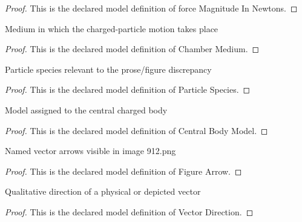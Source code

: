 \begin{proof}
  This is the declared model definition of force Magnitude In Newtons.
\end{proof}
\begin{definition}
  \label{def:physics:phyx-mini-0912:phyxminiproblems-problemphyxmini0912-chambermedium}
  Medium in which the charged-particle motion takes place
\end{definition}
\begin{proof}
  This is the declared model definition of Chamber Medium.
\end{proof}
\begin{definition}
  \label{def:physics:phyx-mini-0912:phyxminiproblems-problemphyxmini0912-particlespecies}
  Particle species relevant to the prose/figure discrepancy
\end{definition}
\begin{proof}
  This is the declared model definition of Particle Species.
\end{proof}
\begin{definition}
  \label{def:physics:phyx-mini-0912:phyxminiproblems-problemphyxmini0912-centralbodymodel}
  Model assigned to the central charged body
\end{definition}
\begin{proof}
  This is the declared model definition of Central Body Model.
\end{proof}
\begin{definition}
  \label{def:physics:phyx-mini-0912:phyxminiproblems-problemphyxmini0912-figurearrow}
  Named vector arrows visible in image 912.png
\end{definition}
\begin{proof}
  This is the declared model definition of Figure Arrow.
\end{proof}
\begin{definition}
  \label{def:physics:phyx-mini-0912:phyxminiproblems-problemphyxmini0912-vectordirection}
  Qualitative direction of a physical or depicted vector
\end{definition}
\begin{proof}
  This is the declared model definition of Vector Direction.
\end{proof}
